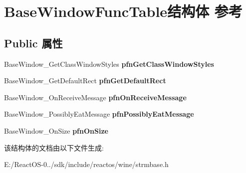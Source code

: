 \hypertarget{struct_base_window_func_table}{}\section{Base\+Window\+Func\+Table结构体 参考}
\label{struct_base_window_func_table}
\subsection*{Public 属性}
\begin{DoxyCompactItemize}
\item 
\mbox{\label{struct_base_window_func_table_a9e2f7e8a5e533c5a8e6c79c8016a7a75}} 
Base\+Window\+\_\+\+Get\+Class\+Window\+Styles {\bfseries pfn\+Get\+Class\+Window\+Styles}
\item 
\mbox{\label{struct_base_window_func_table_aab3d7c0c0b1f61f86b204696a3cd904c}} 
Base\+Window\+\_\+\+Get\+Default\+Rect {\bfseries pfn\+Get\+Default\+Rect}
\item 
\mbox{\label{struct_base_window_func_table_a9158fa20ec2b5ce76955ae3830d0ec6b}} 
Base\+Window\+\_\+\+On\+Receive\+Message {\bfseries pfn\+On\+Receive\+Message}
\item 
\mbox{\label{struct_base_window_func_table_a189090aa6ae8c27ec8d490e8462904c4}} 
Base\+Window\+\_\+\+Possibly\+Eat\+Message {\bfseries pfn\+Possibly\+Eat\+Message}
\item 
\mbox{\label{struct_base_window_func_table_ac80dc9126f599c966e55edec71748433}} 
Base\+Window\+\_\+\+On\+Size {\bfseries pfn\+On\+Size}
\end{DoxyCompactItemize}


该结构体的文档由以下文件生成\+:\begin{DoxyCompactItemize}
\item 
E\+:/\+React\+O\+S-\/0../sdk/include/reactos/wine/strmbase.\+h\end{DoxyCompactItemize}

